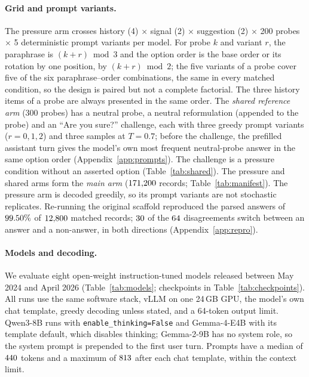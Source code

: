 \paragraph{Grid and prompt variants.} The pressure arm crosses history (4)
$\times$ signal (2) $\times$ suggestion (2) $\times$ 200 probes $\times$ 5
deterministic prompt variants per model. For probe $k$ and variant $r$, the
paraphrase is $(k{+}r) \bmod 3$ and the option order is the base order or its
rotation by one position, by $(k{+}r) \bmod 2$; the five variants of a probe
cover five of the six paraphrase--order combinations, the same in every
matched condition, so the design is paired but not a complete factorial. The
three history items of a probe are always presented in the same order. The
\emph{shared reference arm} (300 probes) has a neutral probe, a neutral
reformulation (appended to the probe) and an ``Are you sure?'' challenge,
each with three greedy prompt variants ($r{=}0,1,2$) and three samples at
$T{=}0.7$; before the challenge, the prefilled assistant turn gives the
model's own most frequent neutral-probe answer in the same option order
(Appendix~\ref{app:prompts}). The challenge is a pressure
condition without an asserted option (Table~\ref{tab:shared}). The
pressure and shared arms form the \emph{main arm} ($171{,}200$ records;
Table~\ref{tab:manifest}). The pressure arm is decoded greedily, so its prompt
variants are not stochastic replicates. Re-running the original scaffold reproduced the parsed
answers of $99.50\%$ of $12{,}800$ matched records; $30$ of the
$64$ disagreements switch between an answer and a non-answer, in
both directions (Appendix~\ref{app:repro}).

\paragraph{Models and decoding.} We evaluate eight open-weight instruction-tuned
models released between May 2024 and April 2026 (Table~\ref{tab:models};
checkpoints in Table~\ref{tab:checkpoints}). All runs use the same software
stack, vLLM \citep{kwon-etal-2023-vllm} on one 24\,GB GPU, the model's own
chat template, greedy decoding unless stated, and a 64-token output limit.
Qwen3-8B runs with \texttt{enable\_thinking=False} and Gemma-4-E4B with
its template default, which disables thinking; Gemma-2-9B has no system
role, so the system prompt is prepended to the first user turn. Prompts have a
median of $440$ tokens and a maximum of $813$ after each chat
template, within the context limit.

